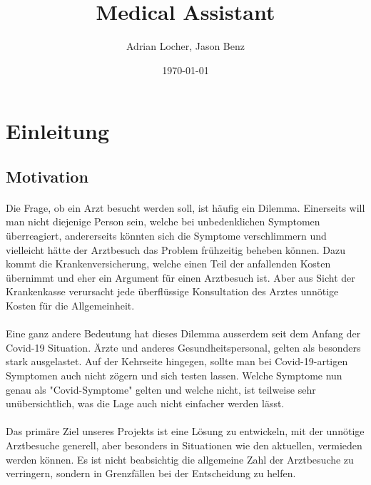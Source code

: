 \documentclass[11pt,a4paper]{article}
\title{Medical Assistant}
\author{Adrian Locher, Jason Benz}
\date{\today}
\begin{document}
\maketitle
\tableofcontents
\newpage


\section{Einleitung}
    \subsection{Motivation}
        \paragraph{}
            Die Frage, ob ein Arzt besucht werden soll, ist häufig ein Dilemma.
            Einerseits will man nicht diejenige Person sein, welche bei unbedenklichen Symptomen
            überreagiert, andererseits könnten sich die Symptome verschlimmern und vielleicht
            hätte der Arztbesuch das Problem frühzeitig beheben können. Dazu kommt die
            Krankenversicherung, welche einen Teil der anfallenden Kosten übernimmt und eher ein Argument
            für einen Arztbesuch ist. Aber aus Sicht der Krankenkasse verursacht jede überflüssige
            Konsultation des Arztes unnötige Kosten für die Allgemeinheit.
            
        \paragraph{}
            Eine ganz andere Bedeutung hat dieses Dilemma ausserdem seit dem Anfang
            der Covid-19 Situation. Ärzte und anderes Gesundheitspersonal, gelten als besonders
            stark ausgelastet. Auf der Kehrseite hingegen, sollte man bei Covid-19-artigen Symptomen
            auch nicht zögern und sich testen lassen. Welche Symptome nun genau als "Covid-Symptome"
            gelten und welche nicht, ist teilweise sehr unübersichtlich, was die Lage auch nicht
            einfacher werden lässt.

        \paragraph{}
            Das primäre Ziel unseres Projekts ist eine Lösung zu entwickeln, mit der unnötige Arztbesuche
            generell, aber besonders in Situationen wie den aktuellen, vermieden werden können.
            Es ist nicht beabsichtig die allgemeine Zahl der Arztbesuche zu verringern, sondern in
            Grenzfällen bei der Entscheidung zu helfen.
        
\end{document}
